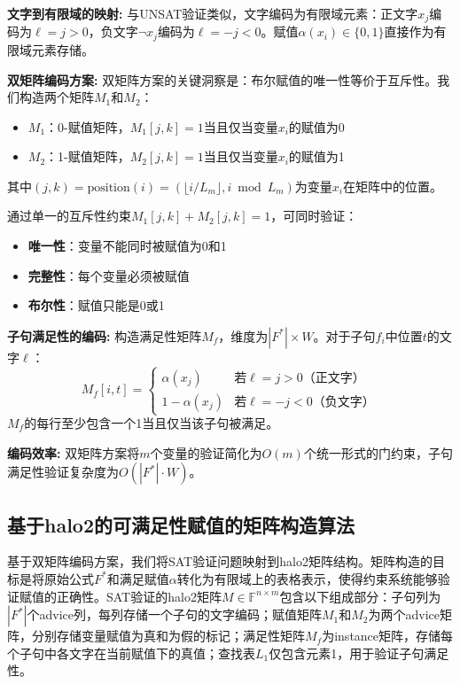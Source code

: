 \textbf{文字到有限域的映射:}
与UNSAT验证类似，文字编码为有限域元素：正文字$x_j$编码为$\ell = j > 0$，负文字$\neg x_j$编码为$\ell = -j < 0$。赋值$\alpha(x_i) \in \{0, 1\}$直接作为有限域元素存储。

\textbf{双矩阵编码方案:}
双矩阵方案的关键洞察是：布尔赋值的唯一性等价于互斥性。我们构造两个矩阵$M_1$和$M_2$：
\begin{itemize}
    \item $M_1$：0-赋值矩阵，$M_1[j,k] = 1$当且仅当变量$x_i$的赋值为0
    \item $M_2$：1-赋值矩阵，$M_2[j,k] = 1$当且仅当变量$x_i$的赋值为1
\end{itemize}
其中$(j, k) = \text{position}(i) = (\lfloor i/L_m \rfloor, i \bmod L_m)$为变量$x_i$在矩阵中的位置。

通过单一的互斥性约束$M_1[j,k] + M_2[j,k] = 1$，可同时验证：
\begin{itemize}
    \item \textbf{唯一性}：变量不能同时被赋值为0和1
    \item \textbf{完整性}：每个变量必须被赋值
    \item \textbf{布尔性}：赋值只能是0或1
\end{itemize}

\textbf{子句满足性的编码:}
构造满足性矩阵$M_f$，维度为$|F^*| \times W$。对于子句$f_i$中位置$t$的文字$\ell$：
$$M_f[i,t] = \begin{cases}
\alpha(x_j) & \text{若$\ell = j > 0$（正文字）} \\
1 - \alpha(x_j) & \text{若$\ell = -j < 0$（负文字）}
\end{cases}$$
$M_f$的每行至少包含一个1当且仅当该子句被满足。

\textbf{编码效率:}
双矩阵方案将$m$个变量的验证简化为$O(m)$个统一形式的门约束，子句满足性验证复杂度为$O(|F^*| \cdot W)$。

\subsection{基于halo2的可满足性赋值的矩阵构造算法}\label{sec:sat-matrix-construction}

基于双矩阵编码方案，我们将SAT验证问题映射到halo2矩阵结构。矩阵构造的目标是将原始公式$F^*$和满足赋值$\alpha$转化为有限域上的表格表示，使得约束系统能够验证赋值的正确性。SAT验证的halo2矩阵$M \in \mathbb{F}^{n \times m}$包含以下组成部分：子句列为$|F^*|$个advice列，每列存储一个子句的文字编码；赋值矩阵$M_1$和$M_2$为两个advice矩阵，分别存储变量赋值为真和为假的标记；满足性矩阵$M_f$为instance矩阵，存储每个子句中各文字在当前赋值下的真值；查找表$L_1$仅包含元素1，用于验证子句满足性。

